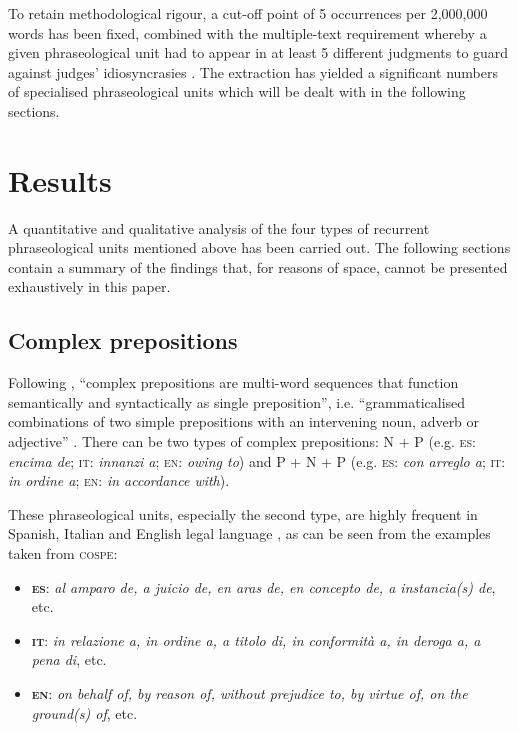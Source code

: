 \documentclass[output=paper]{LSP/langsci}
\begin{document}
\newpage
To retain methodological rigour, a cut-off point of 5 occurrences per 2,000,000 words has been fixed, combined with the multiple-text requirement whereby a given phraseological unit had to appear in at least 5 different judgments to guard against judges’ idiosyncrasies \citep[110]{GozdzRoszkowski2011}.
The extraction has yielded a significant numbers of specialised phraseological units which will be dealt with in the following sections.

\section{Results}
A quantitative and qualitative analysis of the four types of recurrent phraseological units mentioned above has been carried out. The following sections contain a summary of the findings that, for reasons of space, cannot be presented exhaustively in this paper.
\subsection{Complex prepositions}
Following \citet[75]{Biber1999}, “complex prepositions are multi-word sequences that function semantically and syntactically as single preposition”, i.e. “grammaticalised combinations of two simple prepositions with an intervening noun, adverb or adjective” \citep[44]{Granger2008}. There can be two types of complex prepositions: N + P (e.g. \textsc{es}: \textit{encima de}; \textsc{it}: \textit{innanzi a}; \textsc{en}: \textit{owing to}) and P + N + P (e.g. \textsc{es}: \textit{con arreglo a}; \textsc{it}: \textit{in ordine a}; \textsc{en}: \textit{in accordance with}).

These phraseological units, especially the second type, are highly frequent in Spanish, Italian and English legal language \citep[see][]{Pontrandolfo2013b}, as can be seen from the examples taken from \textsc{cospe}:

\begin{itemize}
\item \textbf{\textsc{es}}: \textit{al amparo de, a juicio de, en aras de, en concepto de, a instancia(s) de}, etc.
\item \textbf{\textsc{it}}: \textit{in relazione a, in ordine a, a titolo di, in conformità a, in deroga a, a pena di}, etc.
\item \textbf{\textsc{en}}: \textit{on behalf of, by reason of, without prejudice to, by virtue of, on the ground(s) of}, etc.
\end{itemize}
\end{document}
